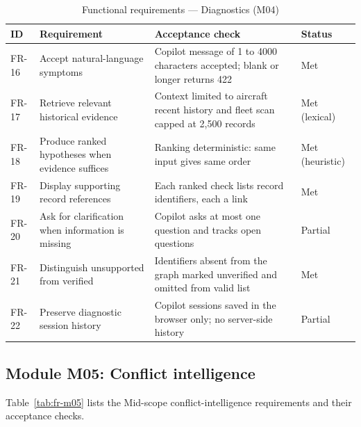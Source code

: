 \begin{table}[H]
\centering
\caption{Functional requirements --- Diagnostics (M04)}
\label{tab:fr-m04}
\small
\begin{tabularx}{\textwidth}{@{}>{\raggedright\arraybackslash}p{} >{\raggedright\arraybackslash}p{} L >{\raggedright\arraybackslash}p{0.14\textwidth}@{}}
\toprule
ID & Requirement & Acceptance check & Status \\
\midrule
FR-16 & Accept natural-language symptoms & Copilot message of 1 to 4000 characters accepted; blank or longer returns 422 & Met \\
FR-17 & Retrieve relevant historical evidence & Context limited to aircraft recent history and fleet scan capped at 2{,}500 records & Met (lexical) \\
FR-18 & Produce ranked hypotheses when evidence suffices & Ranking deterministic: same input gives same order & Met (heuristic) \\
FR-19 & Display supporting record references & Each ranked check lists record identifiers, each a link & Met \\
FR-20 & Ask for clarification when information is missing & Copilot asks at most one question and tracks open questions & Partial \\
FR-21 & Distinguish unsupported from verified & Identifiers absent from the graph marked unverified and omitted from valid list & Met \\
FR-22 & Preserve diagnostic session history & Copilot sessions saved in the browser only; no server-side history & Partial \\
\bottomrule
\end{tabularx}
\end{table}

\subsection{Module M05: Conflict intelligence}

Table~\ref{tab:fr-m05} lists the Mid-scope conflict-intelligence requirements and their acceptance checks.

